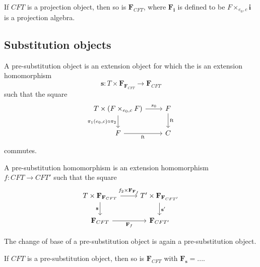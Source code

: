 \begin{cor}
If $CFT$ is a projection object, then so is $\mathbf{F}_{CFT}$, where
$\mathbf{F}_{\mathbf{i}}$ is defined to be $F\times_{e_0,c}\mathbf{i}$ is
a projection algebra.
\end{cor}

\subsection{Substitution objects}

\begin{defn}
A pre-substitution object is an extension object for which the is an
extension homomorphism
\begin{equation*}
\mathbf{s}:T\times\mathbf{F}_{\mathbf{F}_{CFT}}\to \mathbf{F}_{CFT}
\end{equation*}
such that the square
\begin{equation*}
\begin{tikzcd}
T\times(F\times_{e_0,c}F)
  \ar{r}{s_0}
  \ar{d}[swap]{\pi_1(e_0,c)\circ\pi_2}
  &
F \ar{d}{\eft}
  \\
F \ar{r}[swap]{\eft}
  &
C
\end{tikzcd}
\end{equation*}
commutes.
\end{defn}

\begin{defn}
A pre-substitution homomorphism is an extension homomorphism $f:CFT\to CFT'$
such that the square
\begin{equation*}
\begin{tikzcd}
T\times\mathbf{F}_{\mathbf{F}_{CFT}}
  \ar{r}{f_2\times\mathbf{F}_{\mathbf{F}_f}}
  \ar{d}[swap]{\mathbf{s}}
  &
T'\times\mathbf{F}_{\mathbf{F}_{CFT'}}
  \ar{d}{\mathbf{s}'}
  \\
\mathbf{F}_{CFT}
  \ar{r}[swap]{\mathbf{F}_f}
  &
\mathbf{F}_{CFT'}
\end{tikzcd}
\end{equation*}
\end{defn}

\begin{lem}
The change of base of a pre-substitution object is again a pre-substitution object.
\end{lem}

\begin{lem}
If $CFT$ is a pre-substitution object, then so is $\mathbf{F}_{CFT}$ with
$\mathbf{F}_{\mathbf{s}}=...$.
\end{lem}

